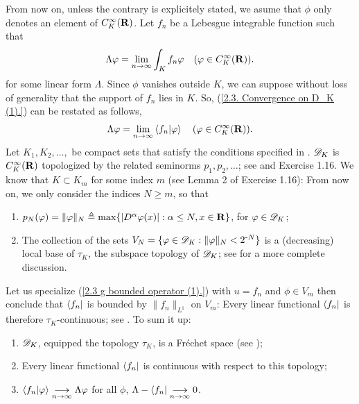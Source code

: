 From now on, unless the contrary is explicitely stated, %
we asume that $\phi$ only denotes an element of $C_K^\infty({\mathbf R})$. 
Let $f_n$ be a Lebesgue integrable function such that %
%
  \begin{align}\label{2.3. Convergence on D_K (1).}
    \Lambda \varphi = \underset{n \to \infty}{\lim} 
      \int_{K} f_n\varphi 
      \quad (\varphi \in C_K^\infty({\mathbf R})).
  \end{align}
%
for some linear form $\Lambda$. %
%
Since $\phi$ vanishes outside $K$, we can suppose without loss of generality %
that the support of $f_n$ lies in $K$. So, %
%
  (\ref{2.3. Convergence on D_K (1).}) %
% 
can be restated as follows, 
%
  \begin{align}
    \Lambda \varphi = \underset{n \to \infty}{\lim} 
      \bra{f_n}\ket{\varphi} 
      \quad (\varphi \in C_K^\infty({\mathbf R})).
  \end{align}
%
Let $K_1, K_2, \dots, $ be compact sets that satisfy the conditions 
specified in . %
${\mathscr D}_K$ is $C_K^\infty({\mathbf R})$ topologized by the related seminorms %
%
  $p_1, p_2, \dots$; see  and Exercise 1.16.
%
We know that $K\subset K_m$ for some index $m$ %
(see Lemma 2 of Exercise 1.16): From now on, we only consider the indices 
$N \geq m$, so that%
%
  \renewcommand{\labelenumi}{(\alph{enumi})}%
  \begin{enumerate}
    \item{
      $p_N(\varphi) = \| \varphi \|_N \triangleq \max 
      \{\lvert D^{\alpha}\varphi(x) \rvert: \alpha \leq N, x \in {\mathbf R}\}$, %
      for $\varphi \in {\mathscr D}_K$;
    }
    \item{
      The collection of the sets %
      $V_N = \{ \varphi \in {\mathscr D}_K:  \| \varphi \|_N < 2^{\text{\small{-}} N}\}$ %
      is a (decreasing) local base of $\tau_K$, the subspace topology of ${\mathscr D}_K$; %
      see  for a more complete discussion.
    }
  \end{enumerate}
  \renewcommand{\labelenumi}{(\roman{enumi})}
%
Let us specialize (\ref{2.3  g  bounded operator (1).}) with %
%
  $u=f_n$ and $ \phi \in V_m$ %
%
then conclude that $\bra{f_n}$ is bounded by $\| f_n \|_{L^1}$ on $V_m$: %
Every linear functional $\bra{f_n}$ is therefore $\tau_K$-continuous; see %
%
  . \newline\newline\noindent
%
To sum it up: %
%
  \begin{enumerate}
    \item{${\mathscr D}_K$, equipped the topology $\tau_K$, is a Fréchet space %
      (see )};
    \item{Every linear functional $\bra{f_n}$ is continuous %
      with respect to this topology;}
    \item{
      $\bra{f_n}\ket{\varphi} \underset{n\to\infty}{\longrightarrow} \Lambda \varphi$ for all $\phi$, 
        \ie 
      $ \Lambda-\bra{f_n} \underset{n\to\infty}{\longrightarrow}0$.
    }
  \end{enumerate}
